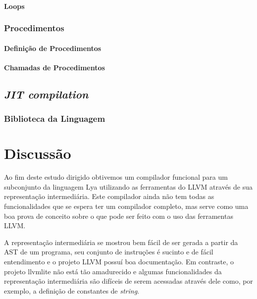 \documentclass[11pt, oneside, titlepage]{report}
\begin{document}
          \subsubsection{Loops}

        \subsection{Procedimentos}

          \subsubsection{Definição de Procedimentos}

          \subsubsection{Chamadas de Procedimentos}

      \section{\textit{JIT compilation}}

        \subsection{Biblioteca da Linguagem}

    \chapter{Discussão}

      Ao fim deste estudo dirigido obtivemos um compilador funcional para um subconjunto da linguagem Lya utilizando as
      ferramentas do LLVM através de sua representação intermediária. Este compilador ainda não tem todas as
      funcionalidades que se espera ter um compilador completo, mas serve como uma boa prova de conceito sobre o que
      pode ser feito com o uso das ferramentas LLVM.

      A representação intermediária se mostrou bem fácil de ser gerada a partir da AST de um programa, seu conjunto de
      instruções é sucinto e de fácil entendimento e o projeto LLVM possuí boa documentação. Em contraste, o projeto
      llvmlite não está tão amadurecido e algumas funcionalidades da representação intermediária são difíceis de serem
      acessadas através dele como, por exemplo, a definição de constantes de \textit{string}.
\end{document}
